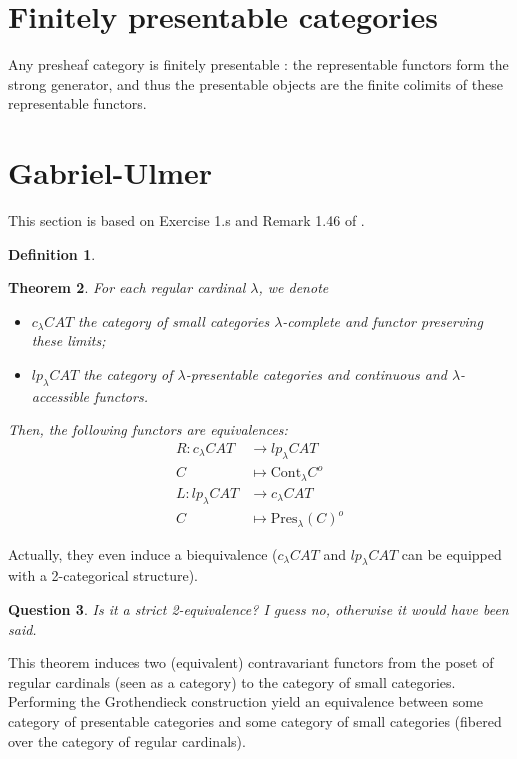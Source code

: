 \documentclass{article}
\newcommand{\Cont}[1]{\text{Cont}_{#1}}
\newcommand{\Pres}[1]{\text{Pres}_{#1}}
\newtheorem{theorem}{Theorem}[section]
\newtheorem{definition}[theorem]{Definition}
\newtheorem{question}[theorem]{Question}
\begin{document}
\section{Finitely presentable categories}
Any presheaf category is finitely presentable \cite{adamek_rosicky}: the
representable functors form the strong generator, and thus the presentable
objects are the finite colimits of these representable functors.

\section{Gabriel-Ulmer}
This section is based on Exercise 1.s and Remark 1.46 of \cite{adamek_rosicky}.
\begin{definition}
  
\end{definition}

\begin{theorem}
  For each regular cardinal $\lambda$, we denote
  \begin{itemize}
  \item 
  $c_{\lambda}CAT$ the category of
small categories $\lambda$-complete and functor preserving these limits;
\item $lp_{\lambda}CAT$ the category of $\lambda$-presentable categories and
  continuous and $\lambda$-accessible functors.
  \end{itemize}
Then, the following functors are equivalences:
\begin{align*}
 R : c_{\lambda}CAT & \rightarrow lp_{\lambda}CAT
  \\
  C & \mapsto \Cont\lambda C^o
      \\
 L : lp_{\lambda}CAT& \rightarrow c_{\lambda}CAT 
  \\
  C & \mapsto \Pres\lambda(C)^o
\end{align*}
\end{theorem}
Actually, they even induce a biequivalence ($c_{\lambda}CAT$ and
$lp_{\lambda}CAT$ can be equipped with a 2-categorical structure).
\begin{question}
 Is it a strict 2-equivalence? I guess no, otherwise it would have been said. 
\end{question}

This theorem induces two (equivalent) contravariant functors
from the poset of regular cardinals (seen
as a category) to the category of small categories. Performing the Grothendieck construction yield
an equivalence between some category of presentable categories and some category
of small categories (fibered over the
category of regular cardinals).
\end{document}
